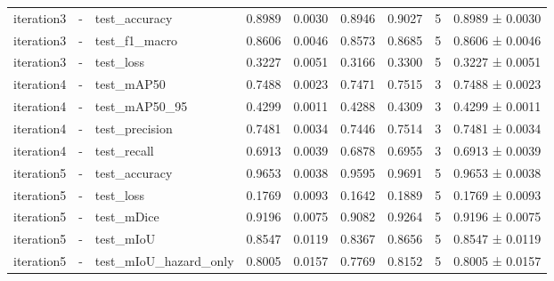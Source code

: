 \begin{table}
\begin{tabular}{lllrrrrrl}
iteration3 & - & test\_accuracy & 0.8989 & 0.0030 & 0.8946 & 0.9027 & 5 & 0.8989 ± 0.0030 \\
iteration3 & - & test\_f1\_macro & 0.8606 & 0.0046 & 0.8573 & 0.8685 & 5 & 0.8606 ± 0.0046 \\
iteration3 & - & test\_loss & 0.3227 & 0.0051 & 0.3166 & 0.3300 & 5 & 0.3227 ± 0.0051 \\
iteration4 & - & test\_mAP50 & 0.7488 & 0.0023 & 0.7471 & 0.7515 & 3 & 0.7488 ± 0.0023 \\
iteration4 & - & test\_mAP50\_95 & 0.4299 & 0.0011 & 0.4288 & 0.4309 & 3 & 0.4299 ± 0.0011 \\
iteration4 & - & test\_precision & 0.7481 & 0.0034 & 0.7446 & 0.7514 & 3 & 0.7481 ± 0.0034 \\
iteration4 & - & test\_recall & 0.6913 & 0.0039 & 0.6878 & 0.6955 & 3 & 0.6913 ± 0.0039 \\
iteration5 & - & test\_accuracy & 0.9653 & 0.0038 & 0.9595 & 0.9691 & 5 & 0.9653 ± 0.0038 \\
iteration5 & - & test\_loss & 0.1769 & 0.0093 & 0.1642 & 0.1889 & 5 & 0.1769 ± 0.0093 \\
iteration5 & - & test\_mDice & 0.9196 & 0.0075 & 0.9082 & 0.9264 & 5 & 0.9196 ± 0.0075 \\
iteration5 & - & test\_mIoU & 0.8547 & 0.0119 & 0.8367 & 0.8656 & 5 & 0.8547 ± 0.0119 \\
iteration5 & - & test\_mIoU\_hazard\_only & 0.8005 & 0.0157 & 0.7769 & 0.8152 & 5 & 0.8005 ± 0.0157 \\
\bottomrule
\end{tabular}
\end{table}
